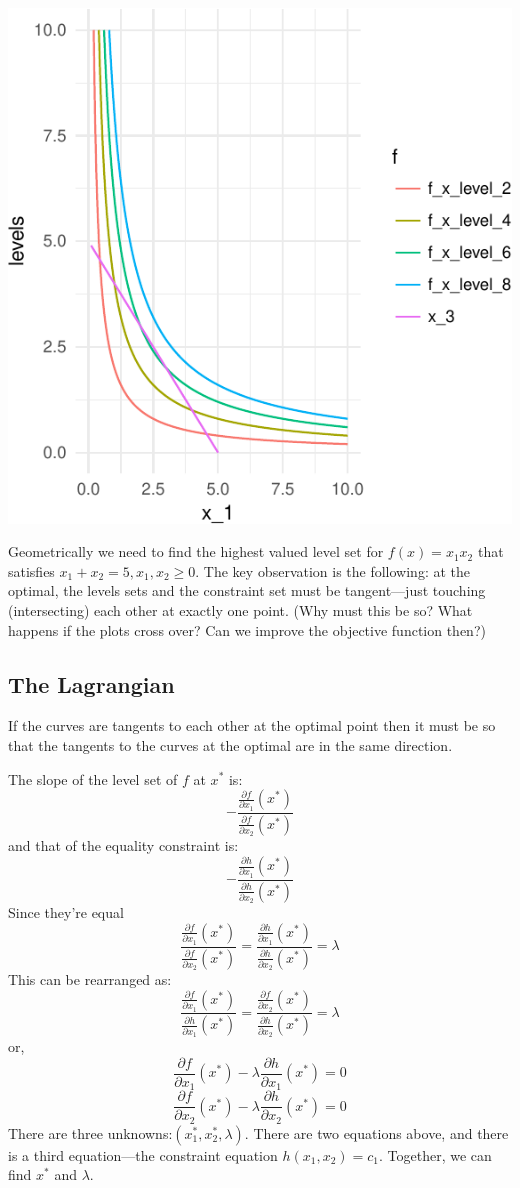 \documentclass[11pt,]{article}
\begin{document}
\includegraphics{Optimization_2_files/figure-latex/opt_dim_2_eq_constr-1.pdf}

Geometrically we need to find the highest valued level set for
\(f(x) = x_1x_2\) that satisfies \(x_1+x_2=5, x_1, x_2\geq 0\). The key
observation is the following: at the optimal, the levels sets and the
constraint set must be tangent---just touching (intersecting) each other
at exactly one point. (Why must this be so? What happens if the plots
cross over? Can we improve the objective function then?)

\subsection{The Lagrangian}\label{the-lagrangian}

If the curves are tangents to each other at the optimal point then it
must be so that the tangents to the curves at the optimal are in the
same direction.

The slope of the level set of \(f\) at \(x^*\) is: \[
-\frac{\frac{\partial f}{\partial x_1}(x^*)}{\frac{\partial f}{\partial x_2}(x^*)}
\] and that of the equality constraint is: \[
-\frac{\frac{\partial h}{\partial x_1}(x^*)}{\frac{\partial h}{\partial x_2}(x^*)}
\] Since they're equal \[
\frac{\frac{\partial f}{\partial x_1}(x^*)}{\frac{\partial f}{\partial x_2}(x^*)} =
\frac{\frac{\partial h}{\partial x_1}(x^*)}{\frac{\partial h}{\partial x_2}(x^*)} =
\lambda
\] This can be rearranged as: \[
\frac{\frac{\partial f}{\partial x_1}(x^*)}{\frac{\partial h}{\partial x_1}(x^*)} =
\frac{\frac{\partial f}{\partial x_2}(x^*)}{\frac{\partial h}{\partial x_2}(x^*)} =
\lambda
\] or, \[
\frac{\partial f}{\partial x_1}(x^*)-\lambda\frac{\partial h}{\partial x_1}(x^*)=0
\] \[
\frac{\partial f}{\partial x_2}(x^*)-\lambda\frac{\partial h}{\partial x_2}(x^*)=0
\] There are three unknowns:\((x_1^*, x_2^*, \lambda)\). There are two
equations above, and there is a third equation---the constraint equation
\(h(x_1, x_2) = c_1\). Together, we can find \(x^*\) and \(\lambda\).
\end{document}
